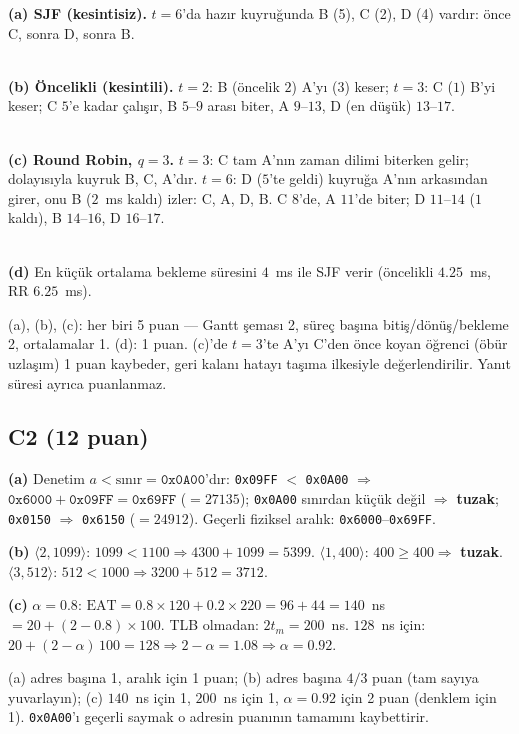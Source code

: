 \textbf{(a) SJF (kesintisiz).} $t=6$'da hazır kuyruğunda B (5), C (2), D (4) vardır: önce C, sonra D, sonra B.\\[0.2em]
\\[0.3em]
{\small{}}

\textbf{(b) Öncelikli (kesintili).} $t=2$: B (öncelik $2$) A'yı ($3$) keser; $t=3$: C ($1$) B'yi keser; C $5$'e kadar çalışır, B $5$--$9$ arası biter, A $9$--$13$, D (en düşük) $13$--$17$.\\[0.2em]
\\[0.3em]
{\small{}}

\textbf{(c) Round Robin, $q = 3$.} $t=3$: C tam A'nın zaman dilimi biterken gelir; dolayısıyla kuyruk B, C, A'dır. $t=6$: D ($5$'te geldi) kuyruğa A'nın arkasından girer, onu B ($2$~ms kaldı) izler: C, A, D, B. C $8$'de, A $11$'de biter; D $11$--$14$ ($1$ kaldı), B $14$--$16$, D $16$--$17$.\\[0.2em]
\\[0.3em]
{\small{}}

\textbf{(d)} En küçük ortalama bekleme süresini $4$~ms ile SJF verir (öncelikli $4.25$~ms, RR $6.25$~ms).
\begin{rubric}(a), (b), (c): her biri 5 puan --- Gantt şeması 2, süreç başına bitiş/dönüş/bekleme 2, ortalamalar 1. (d): 1 puan. (c)'de $t=3$'te A'yı C'den önce koyan öğrenci (öbür uzlaşım) 1 puan kaybeder, geri kalanı hatayı taşıma ilkesiyle değerlendirilir. Yanıt süresi ayrıca puanlanmaz.\end{rubric}

\subsection*{C2 (12 puan)}
\textbf{(a)} Denetim $a < \text{sınır} = \texttt{0x0A00}$'dır:
\texttt{0x09FF} $<$ \texttt{0x0A00} $\Rightarrow$ $\texttt{0x6000} + \texttt{0x09FF} = \texttt{0x69FF}$ ($= 27135$);
\texttt{0x0A00} sınırdan küçük değil $\Rightarrow$ \textbf{tuzak};
\texttt{0x0150} $\Rightarrow$ \texttt{0x6150} ($= 24912$).
Geçerli fiziksel aralık: \texttt{0x6000}--\texttt{0x69FF}.

\textbf{(b)} $\langle 2, 1099\rangle$: $1099 < 1100 \Rightarrow 4300 + 1099 = 5399$. \quad $\langle 1, 400\rangle$: $400 \ge 400 \Rightarrow$ \textbf{tuzak}. \quad $\langle 3, 512\rangle$: $512 < 1000 \Rightarrow 3200 + 512 = 3712$.

\textbf{(c)} $\alpha = 0.8$: $\text{EAT} = 0.8 \times 120 + 0.2 \times 220 = 96 + 44 = 140$~ns $= 20 + (2 - 0.8)\times 100$. TLB olmadan: $2t_m = 200$~ns. $128$~ns için: $20 + (2-\alpha)\,100 = 128 \Rightarrow 2 - \alpha = 1.08 \Rightarrow \alpha = 0.92$.
\begin{rubric}(a) adres başına 1, aralık için 1 puan; (b) adres başına $4/3$ puan (tam sayıya yuvarlayın); (c) $140$~ns için 1, $200$~ns için 1, $\alpha = 0.92$ için 2 puan (denklem için 1). \texttt{0x0A00}'ı geçerli saymak o adresin puanının tamamını kaybettirir.\end{rubric}

